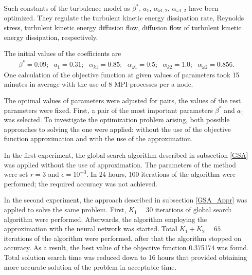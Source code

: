 \documentclass[sensors,article,submit,moreauthors,pdftex]{Definitions/mdpi}
\begin{document}
Such constants of the turbulence model as $\beta^*$, $a_1$, $\alpha_{k 1,2}$, $\alpha_{\omega 1,2}$ have been optimized. They regulate the turbulent kinetic energy dissipation rate, Reynolds stress, turbulent kinetic energy diffusion flow, diffusion flow of turbulent kinetic energy dissipation, respectively.

The initial values of the coefficients are
\begin{equation}
	\begin{aligned}
		\beta^* = 0.09;\ \ \ a_1 = 0.31;\ \ \ \alpha_{k 1} = 0.85;\ \ \ \alpha_{\omega 1} = 0.5; \ \ \ \alpha_{k 2} = 1.0;\ \ \ \alpha_{\omega 2} = 0.856.
	\end{aligned}
\end{equation}
One calculation of the objective function at given values of parameters took 15 minutes in average with the use of 8 MPI-processes per a node. 

The optimal values of parameters were adjusted for pairs, the values of the rest parameters were fixed. 
First, a pair of the most important parameters $\beta^*$ and $a_1$ was selected. 
To investigate the optimization problem arising, both possible approaches to solving the one were applied: without the use of the objective function approximation  and with the use of the approximation.

In the first experiment, the global search algorithm described in subsection \ref{GSA} was applied without the use of approximation. 
The parameters of the method were set $r = 3$ and $\epsilon = 10^{-3}$. 
In 24 hours, 100 iterations of the algorithm were performed; the required accuracy was not achieved. 

In the second experiment, the approach described in subsection \ref{GSA_Appr} was applied to solve the same problem.
First, $K_1 = 30$ iterations of global search algorithm were performed. 
Afterwards, the algorithm employing the approximation with the neural network was started. 
Total $K_1 + K_2 = 65$ iterations of the algorithm were performed, after that the algorithm stopped on accuracy. 
As a result, the best value  of the objective function 0.375174 was found. 
Total solution search time was reduced down to 16 hours that provided obtaining more accurate solution of the problem in acceptable time.
\end{document}
